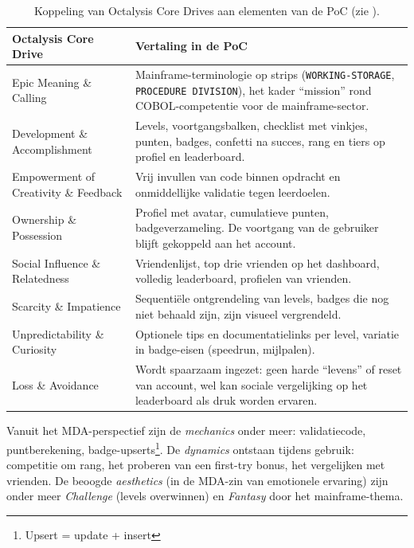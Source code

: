 \begin{table}[H]
\centering
\small
\begin{tabularx}{\textwidth}{|p{4.2cm}|X|}
\hline
\textbf{Octalysis Core Drive} & \textbf{Vertaling in de PoC} \\
\hline
Epic Meaning \& Calling &
Mainframe-terminologie op strips (\texttt{WORKING-STORAGE}, \texttt{PROCEDURE DIVISION}), het kader ``mission'' rond COBOL-competentie voor de mainframe-sector. \\
\hline
Development \& Accomplishment &
Levels, voortgangsbalken, checklist met vinkjes, punten, badges, confetti na succes, rang en tiers op profiel en leaderboard. \\
\hline
Empowerment of Creativity \& Feedback &
Vrij invullen van code binnen opdracht en onmiddellijke validatie tegen leerdoelen. \\
    \hline
Ownership \& Possession &
Profiel met avatar, cumulatieve punten, badgeverzameling. De voortgang van de gebruiker blijft gekoppeld aan het account. \\
\hline
Social Influence \& Relatedness &
Vriendenlijst, top drie vrienden op het dashboard, volledig leaderboard, profielen van vrienden. \\
\hline
Scarcity \& Impatience &
Sequentiële ontgrendeling van levels, badges die nog niet behaald zijn, zijn visueel vergrendeld. \\
\hline
Unpredictability \& Curiosity &
Optionele tips en documentatielinks per level, variatie in badge-eisen (speedrun, mijlpalen). \\
\hline
Loss \& Avoidance &
Wordt spaarzaam ingezet: geen harde \enquote{levens} of reset van account, wel kan sociale vergelijking op het leaderboard als druk worden ervaren. \\
\hline
\end{tabularx}
\caption{Koppeling van Octalysis Core Drives aan elementen van de PoC (zie \textcite{Chou2015}).}
\label{tab:poc-octalysis-koppeling}
\end{table}

Vanuit het MDA-perspectief \autocite{Hunicke2004} zijn de \textit{mechanics} onder meer: validatiecode, puntberekening, badge-upserts\footnote{Upsert = update + insert}.
De \textit{dynamics} ontstaan tijdens gebruik: competitie om rang, het proberen van een first-try bonus, het vergelijken met vrienden.
De beoogde \textit{aesthetics} (in de MDA-zin van emotionele ervaring) zijn onder meer \textit{Challenge} (levels overwinnen) en \textit{Fantasy} door het mainframe-thema.

